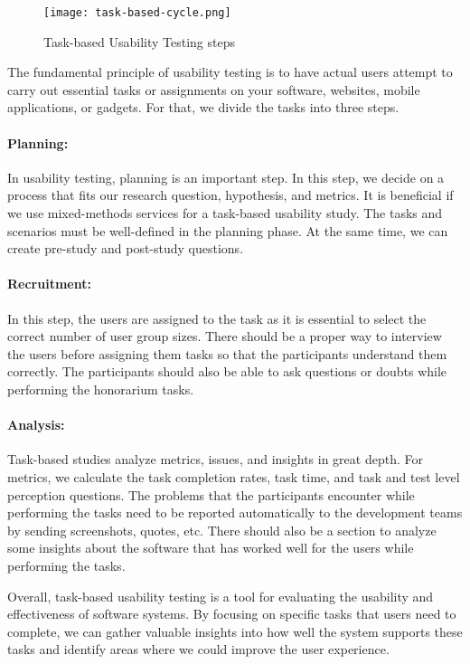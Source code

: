 \begin{figure}[htbp!]
  \centering    
  \texttt{[image: task-based-cycle.png]}
  \caption[Tasks steps]{Task-based Usability Testing steps}
  \label{fig:background:taskssteps}
\end{figure}
The fundamental principle of usability testing is to have actual users attempt to carry out essential tasks or assignments on your software, websites, mobile applications, or gadgets.
For that, we divide the tasks into three steps.
\paragraph{Planning:}
In usability testing, planning is an important step. 
In this step, we decide on a process that fits our research question, hypothesis, and metrics.  
It is beneficial if we use mixed-methods services for a task-based usability study.
The tasks and scenarios must be well-defined in the planning phase. At the same time, we can create pre-study and post-study questions. 
\paragraph{Recruitment:} 
In this step, the users are assigned to the task as it is essential to select the correct number of user group sizes.
There should be a proper way to interview the users before assigning them tasks so that the participants understand them correctly. 
The participants should also be able to ask questions or doubts while performing the honorarium tasks. 
\paragraph{Analysis:}
Task-based studies analyze metrics, issues, and insights in great depth.
For metrics, we calculate the task completion rates, task time, and task and test level perception questions.
The problems that the participants encounter while performing the tasks need to be reported automatically to the development teams by sending screenshots, quotes, etc. 
There should also be a section to analyze some insights about the software that has worked well for the users while performing the tasks.

Overall, task-based usability testing is a tool for evaluating the usability and effectiveness of software systems. 
By focusing on specific tasks that users need to complete, we can gather valuable insights into how well the system supports these tasks and identify areas where we could improve the user experience.
\clearpage

